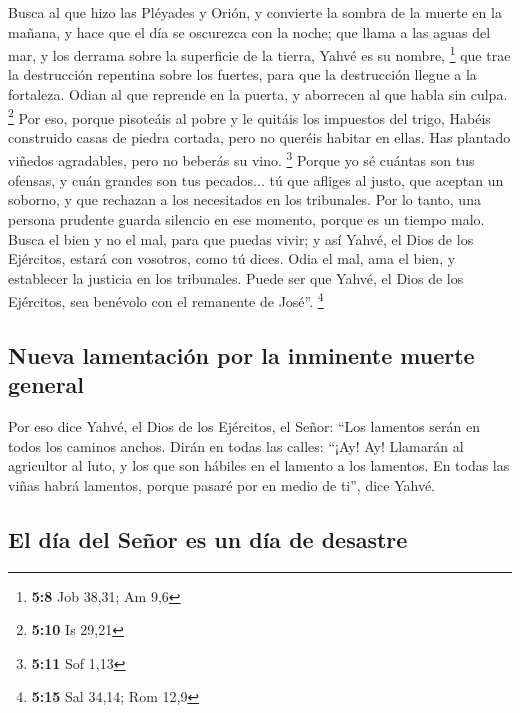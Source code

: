 \begin{paracol}{2}
 Busca al que hizo las Pléyades y Orión, y convierte la
sombra de la muerte en la mañana, y hace que el día se oscurezca con la
noche; que llama a las aguas del mar, y los derrama sobre la superficie
de la tierra, Yahvé es su nombre, \footnote{\textbf{5:8} Job 38,31; Am
  9,6}  que trae la destrucción repentina sobre los
fuertes, para que la destrucción llegue a la fortaleza. 
Odian al que reprende en la puerta, y aborrecen al que habla sin culpa.
\footnote{\textbf{5:10} Is 29,21}  Por eso, porque
pisoteáis al pobre y le quitáis los impuestos del trigo, Habéis
construido casas de piedra cortada, pero no queréis habitar en ellas.
Has plantado viñedos agradables, pero no beberás su vino. \footnote{\textbf{5:11}
  Sof 1,13}  Porque yo sé cuántas son tus ofensas, y cuán
grandes son tus pecados... tú que afliges al justo, que aceptan un
soborno, y que rechazan a los necesitados en los tribunales.
 Por lo tanto, una persona prudente guarda silencio en
ese momento, porque es un tiempo malo.  Busca el bien y
no el mal, para que puedas vivir; y así Yahvé, el Dios de los Ejércitos,
estará con vosotros, como tú dices.  Odia el mal, ama el
bien, y establecer la justicia en los tribunales. Puede ser que Yahvé,
el Dios de los Ejércitos, sea benévolo con el remanente de José''.
\footnote{\textbf{5:15} Sal 34,14; Rom 12,9}

\hypertarget{nueva-lamentaciuxf3n-por-la-inminente-muerte-general}{%
\subsection{Nueva lamentación por la inminente muerte
general}\label{nueva-lamentaciuxf3n-por-la-inminente-muerte-general}}

 Por eso dice Yahvé, el Dios de los Ejércitos, el Señor:
``Los lamentos serán en todos los caminos anchos. Dirán en todas las
calles: ``¡Ay! Ay! Llamarán al agricultor al luto, y los que son hábiles
en el lamento a los lamentos.  En todas las viñas habrá
lamentos, porque pasaré por en medio de ti'', dice Yahvé.

\hypertarget{el-duxeda-del-seuxf1or-es-un-duxeda-de-desastre}{%
\subsection{El día del Señor es un día de
desastre}\label{el-duxeda-del-seuxf1or-es-un-duxeda-de-desastre}}


\end{paracol}
